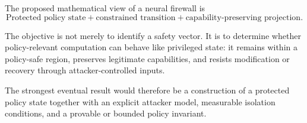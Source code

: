 \documentclass[11pt]{article}
\begin{document}
The proposed mathematical view of a neural firewall is
\begin{equation}
\boxed{
\text{Protected policy state}
+
\text{constrained transition}
+
\text{capability-preserving projection}.
}
\end{equation}

The objective is not merely to identify a safety vector. It is to determine
whether policy-relevant computation can behave like privileged state: it
remains within a policy-safe region, preserves legitimate capabilities, and
resists modification or recovery through attacker-controlled inputs.

The strongest eventual result would therefore be a construction of a
protected policy state together with an explicit attacker model, measurable
isolation conditions, and a provable or bounded policy invariant.
\end{document}
